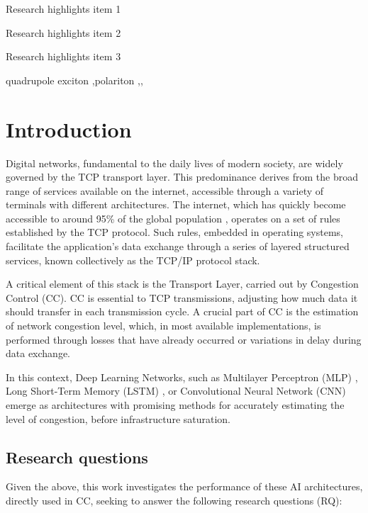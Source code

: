 \documentclass[a4paper,fleqn]{cas-sc}
\begin{document}
\begin{highlights}
\item Research highlights item 1
\item Research highlights item 2
\item Research highlights item 3
\end{highlights}

\begin{keywords}
quadrupole exciton \sep polariton \sep \WGM \sep \BEC
\end{keywords}


\maketitle


\section{Introduction}
Digital networks, fundamental to the daily lives of modern society, are widely governed by the TCP transport layer. This predominance derives from the broad range of services available on the internet, accessible through a variety of terminals with different architectures. The internet, which has quickly become accessible to around 95\% of the global population \cite{b0000049}, operates on a set of rules established by the TCP protocol. Such rules, embedded in operating systems, facilitate the application's data exchange through a series of layered structured services, known collectively as the TCP/IP protocol stack.

A critical element of this stack is the Transport Layer, carried out by Congestion Control (CC). CC is essential to TCP transmissions, adjusting how much data it should transfer in each transmission cycle. A crucial part of CC is the estimation of network congestion level, which, in most available implementations, is performed through losses that have already occurred or variations in delay during data exchange.

In this context, Deep Learning Networks, such as Multilayer Perceptron (MLP) \cite{b0000062}, Long Short-Term Memory (LSTM) \cite{b0000060}, or Convolutional Neural Network (CNN)  \cite{b0000061} emerge as architectures with promising methods for accurately estimating the level of congestion, before infrastructure saturation.

\subsection{Research questions}
Given the above, this work investigates the performance of these AI architectures, directly used in CC, seeking to answer the following research questions (RQ):
\end{document}
